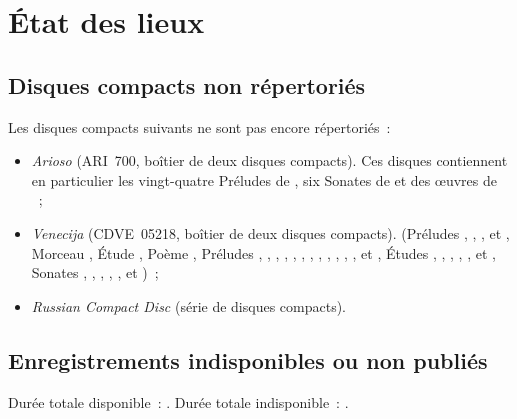 \chapter[%
État des lieux][%
État des lieux]{%
État des lieux}
\label{chap:Etat-des-lieux}

\section{Disques compacts non répertoriés}
\label{sec:Nonrepertorie}

Les disques compacts suivants ne sont pas encore répertoriés~:
\begin{itemize}
 \item
 \emph{Arioso} (ARI~700, boîtier de deux disques compacts).
 Ces disques contiennent en particulier les vingt-quatre Préludes 
 de \Chopin{}, six Sonates de \Scriabine{} et des œuvres de \Liadov{}~;
 \item
 \emph{Venecija} (CDVE~05218, boîtier de deux disques compacts).
 \Scriabine{} (Préludes  ,  ,
  ,   et  ,
 Morceau  , Étude  , Poème 
 , Préludes  ,  , 
 ,  ,  , 
 ,  ,  , 
 ,  ,  , 
 ,   et  , Études
  ,  ,  , 
 ,  ,   et 
 , Sonates , , , , ,
  et )~;
 \item
 \emph{Russian Compact Disc} (série de disques compacts).
\end{itemize}

\section{Enregistrements indisponibles ou non publiés}
\label{sec:IndisponibleNonpublie}

Durée totale disponible~: \availabletotaltime.
Durée totale indisponible~: \unavailabletotaltime.
